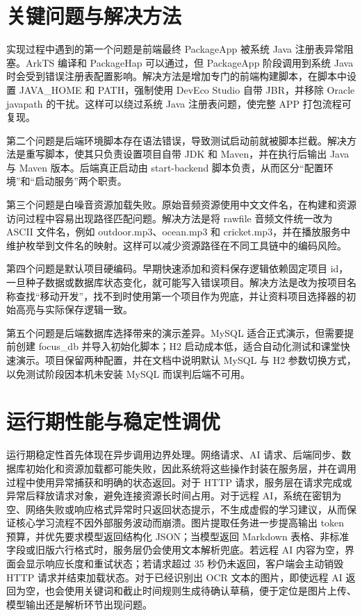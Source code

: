 \section{关键问题与解决方法}

实现过程中遇到的第一个问题是前端最终 PackageApp 被系统 Java 注册表异常阻塞。ArkTS 编译和 PackageHap 可以通过，但 PackageApp 阶段调用到系统 Java 时会受到错误注册表配置影响。解决方法是增加专门的前端构建脚本，在脚本中设置 JAVA\_HOME 和 PATH，强制使用 DevEco Studio 自带 JBR，并移除 Oracle javapath 的干扰。这样可以绕过系统 Java 注册表问题，使完整 APP 打包流程可复现。

第二个问题是后端环境脚本存在语法错误，导致测试启动前就被脚本拦截。解决方法是重写脚本，使其只负责设置项目自带 JDK 和 Maven，并在执行后输出 Java 与 Maven 版本。后端真正启动由 start-backend 脚本负责，从而区分“配置环境”和“启动服务”两个职责。

第三个问题是白噪音资源加载失败。原始音频资源使用中文文件名，在构建和资源访问过程中容易出现路径匹配问题。解决方法是将 rawfile 音频文件统一改为 ASCII 文件名，例如 outdoor.mp3、ocean.mp3 和 cricket.mp3，并在播放服务中维护枚举到文件名的映射。这样可以减少资源路径在不同工具链中的编码风险。

第四个问题是默认项目硬编码。早期快速添加和资料保存逻辑依赖固定项目 id，一旦种子数据或数据库状态变化，就可能写入错误项目。解决方法是改为按项目名称查找“移动开发”，找不到时使用第一个项目作为兜底，并让资料项目选择器的初始高亮与实际保存逻辑一致。

第五个问题是后端数据库选择带来的演示差异。MySQL 适合正式演示，但需要提前创建 focus\_db 并导入初始化脚本；H2 启动成本低，适合自动化测试和课堂快速演示。项目保留两种配置，并在文档中说明默认 MySQL 与 H2 参数切换方式，以免测试阶段因本机未安装 MySQL 而误判后端不可用。

\section{运行期性能与稳定性调优}

运行期稳定性首先体现在异步调用边界处理。网络请求、AI 请求、后端同步、数据库初始化和资源加载都可能失败，因此系统将这些操作封装在服务层，并在调用过程中使用异常捕获和明确的状态返回。对于 HTTP 请求，服务层在请求完成或异常后释放请求对象，避免连接资源长时间占用。对于远程 AI，系统在密钥为空、网络失败或响应格式异常时只返回状态提示，不生成虚假的学习建议，从而保证核心学习流程不因外部服务波动而崩溃。图片提取任务进一步提高输出 token 预算，并优先要求模型返回结构化 JSON；当模型返回 Markdown 表格、非标准字段或旧版六行格式时，服务层仍会使用文本解析兜底。若远程 AI 内容为空，界面会显示响应长度和重试状态；若请求超过 35 秒仍未返回，客户端会主动销毁 HTTP 请求并结束加载状态。对于已经识别出 OCR 文本的图片，即使远程 AI 返回为空，也会使用关键词和截止时间规则生成待确认草稿，便于定位是图片上传、模型输出还是解析环节出现问题。

